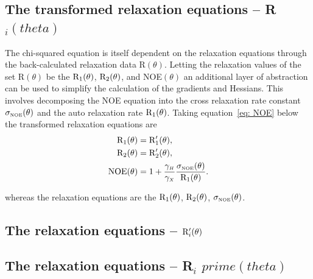 \begin{htmlonly}
\begin{htmlonly}
\begin{htmlonly}
    \subsection{The transformed relaxation equations -- R$_i(theta)$}
\end{htmlonly}

The chi-squared equation is itself dependent on the relaxation equations through the back-calculated relaxation data R$(\theta)$.
Letting the relaxation values of the set R$(\theta)$ be the $\mathrm{R}_1(\theta)$, $\mathrm{R}_2(\theta)$, and NOE$(\theta)$ an additional layer of abstraction can be used to simplify the calculation of the gradients and Hessians.
This involves decomposing the NOE equation into the cross relaxation rate constant $\sigma_{\scriptscriptstyle \mathrm{NOE}}(\theta)$ and the auto relaxation rate $\mathrm{R}_1(\theta)$.
Taking equation~\eqref{eq: NOE} below the transformed relaxation equations are
\begin{subequations}
\begin{align}
    \mathrm{R}_1(\theta) &= \mathrm{R}_1'(\theta), \\
    \mathrm{R}_2(\theta) &= \mathrm{R}_2'(\theta), \\
    \mathrm{NOE}(\theta)  &= 1 + \frac{\gamma_{\scriptscriptstyle H}}{\gamma_{\scriptscriptstyle X}} \frac{\sigma_{\scriptscriptstyle \mathrm{NOE}}(\theta)}{\mathrm{R}_1(\theta)}.
\end{align}
\end{subequations}

\noindent whereas the relaxation equations are the $\mathrm{R}_1(\theta)$, $\mathrm{R}_2(\theta)$, $\sigma_{\scriptscriptstyle \mathrm{NOE}}(\theta)$.



\begin{latexonly}
    \subsection{The relaxation equations -- $\mathrm{R}_i'(\theta)$}
\end{latexonly}
\begin{htmlonly}
    \subsection{The relaxation equations -- R$_i$ $prime(theta)$}
\end{htmlonly}


\end{htmlonly}
\end{htmlonly}
